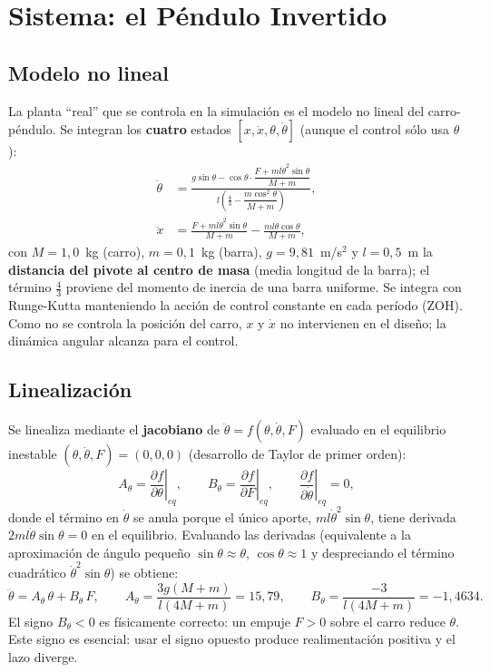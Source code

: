 \documentclass[a4paper,11pt]{report}
\begin{document}
\section{Sistema: el Péndulo Invertido}

\subsection{Modelo no lineal}

La planta ``real'' que se controla en la simulación es el modelo no lineal del
carro-péndulo. Se integran los \textbf{cuatro} estados $[x, \dot x, \theta,
\dot\theta]$ (aunque el control sólo usa $\theta$):
\begin{align}
  \ddot\theta &= \frac{g\sin\theta - \cos\theta \cdot \dfrac{F + m l \dot\theta^2 \sin\theta}{M+m}}
  {l\left(\tfrac{4}{3} - \dfrac{m\cos^2\theta}{M+m}\right)}, \\[0.4em]
  \ddot x &= \frac{F + m l \dot\theta^2 \sin\theta}{M+m} - \frac{m l \ddot\theta \cos\theta}{M+m},
\end{align}
con $M = 1{,}0$~kg (carro), $m = 0{,}1$~kg (barra), $g = 9{,}81$~m/s$^2$ y
$l = 0{,}5$~m la \textbf{distancia del pivote al centro de masa} (media longitud
de la barra); el término $\tfrac{4}{3}$ proviene del momento de inercia de una
barra uniforme. Se integra con Runge-Kutta manteniendo la acción de control
constante en cada período (ZOH). Como no se controla la posición del carro, $x$
y $\dot x$ no intervienen en el diseño; la dinámica angular alcanza para el
control.

\subsection{Linealización}

Se linealiza mediante el \textbf{jacobiano} de $\ddot\theta = f(\theta,
\dot\theta, F)$ evaluado en el equilibrio inestable $(\theta, \dot\theta, F) =
(0, 0, 0)$ (desarrollo de Taylor de primer orden):
\begin{equation}
  A_\theta = \left.\frac{\partial f}{\partial \theta}\right|_{eq}, \qquad
  B_\theta = \left.\frac{\partial f}{\partial F}\right|_{eq}, \qquad
  \left.\frac{\partial f}{\partial \dot\theta}\right|_{eq} = 0,
\end{equation}
donde el término en $\dot\theta$ se anula porque el único aporte, $m l
\dot\theta^2 \sin\theta$, tiene derivada $2 m l \dot\theta \sin\theta = 0$ en el
equilibrio. Evaluando las derivadas (equivalente a la aproximación de ángulo
pequeño $\sin\theta\approx\theta$, $\cos\theta\approx1$ y despreciando el término
cuadrático $\dot\theta^2\sin\theta$) se obtiene:
\begin{equation}
  \ddot\theta = A_\theta\,\theta + B_\theta\,F, \qquad
  A_\theta = \frac{3g(M+m)}{l(4M+m)} = 15{,}79, \qquad
  B_\theta = \frac{-3}{l(4M+m)} = -1{,}4634 .
\end{equation}
El signo $B_\theta < 0$ es físicamente correcto: un empuje $F>0$ sobre el carro
reduce $\theta$. Este signo es esencial: usar el signo opuesto produce
realimentación positiva y el lazo diverge.
\end{document}
